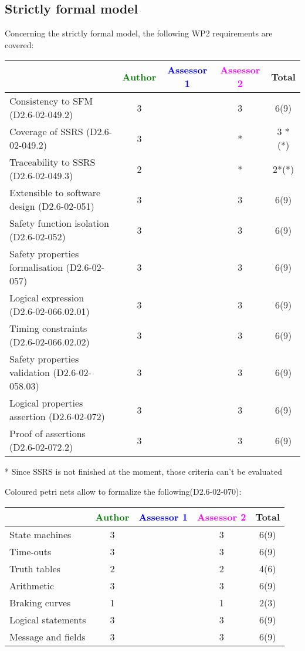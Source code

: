 \subsection{Strictly formal model}

Concerning the strictly formal model, the following WP2 requirements are covered:

\begin{tabular}{|l | c | c | c | c|}
\hline
& \textcolor{green}{Author} & \textcolor{blue}{Assessor 1} & \textcolor{magenta}{Assessor 2} & Total \\
\hline 
Consistency to SFM (D2.6-02-049.2) & 3     & & 3     &  6(9) \\
\hline
Coverage of SSRS (D2.6-02-049.2)  & 3     & & * & 3 *(*) \\
\hline
Traceability to  SSRS (D2.6-02-049.3)  & 2     & & * &  2*(*) \\
\hline
Extensible to software design (D2.6-02-051)  & 3     & & 3     &  6(9) \\
\hline
Safety function isolation (D2.6-02-052)  & 3     & & 3     &  6(9) \\
\hline 
Safety properties formalisation (D2.6-02-057)  & 3     & & 3     &  6(9) \\
\hline
Logical expression (D2.6-02-066.02.01)  & 3     & & 3     &  6(9) \\
\hline
Timing constraints (D2.6-02-066.02.02)  & 3     & & 3     &  6(9) \\
\hline
Safety properties validation (D2.6-02-058.03)  & 3     & & 3     &  6(9) \\
\hline
Logical properties assertion (D2.6-02-072)  & 3     & & 3     &  6(9) \\
\hline
Proof of assertions (D2.6-02-072.2)  & 3     & & 3     &  6(9) \\
\hline
\end{tabular}

\begin{assessor2}
* Since SSRS is not finished at the moment, those criteria can't be evaluated
\end{assessor2}

Coloured petri nets allow to formalize the following(D2.6-02-070):

\begin{tabular}{|l | c | c | c | c|}
\hline
& \textcolor{green}{Author} & \textcolor{blue}{Assessor 1} & \textcolor{magenta}{Assessor 2} & Total \\
\hline 
State machines  & 3     & & 3     &  6(9) \\
\hline
Time-outs  & 3     & & 3     &  6(9) \\
\hline
Truth tables  & 2     & & 2     &  4(6) \\
\hline
Arithmetic  & 3     & & 3     &  6(9) \\
\hline
Braking curves  & 1     & & 1     &  2(3) \\
\hline
Logical statements & 3     & & 3     &  6(9) \\
\hline
Message and fields & 3     & & 3     &  6(9) \\
\hline
\end{tabular}

